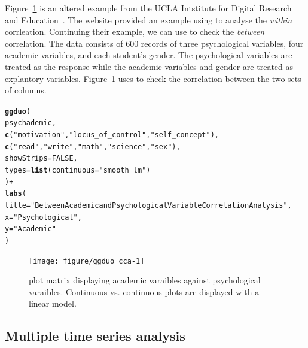 \documentclass[stat,dissertation]{puthesis}\usepackage[]{graphicx}\usepackage{xcolor}
\makeatletter
\newcommand{\hlnum}[1]{\textcolor[rgb]{0.686,0.059,0.569}{#1}}%
\newcommand{\hlstr}[1]{\textcolor[rgb]{0.192,0.494,0.8}{#1}}%
\newcommand{\hlopt}[1]{\textcolor[rgb]{0,0,0}{#1}}%
\newcommand{\hlstd}[1]{\textcolor[rgb]{0.345,0.345,0.345}{#1}}%
\newcommand{\hlkwc}[1]{\textcolor[rgb]{0.333,0.667,0.333}{#1}}%
\newcommand{\hlkwd}[1]{\textcolor[rgb]{0.737,0.353,0.396}{\textbf{#1}}}%
\newenvironment{kframe}{%
 \def\at@end@of@kframe{}%
 \ifinner\ifhmode%
  \def\at@end@of@kframe{\end{minipage}}%
  \begin{minipage}{\columnwidth}%
 \fi\fi%
 \def\FrameCommand##1{\hskip\@totalleftmargin \hskip-\fboxsep
 \colorbox{shadecolor}{##1}\hskip-\fboxsep
     \hskip-\linewidth \hskip-\@totalleftmargin \hskip\columnwidth}%
 \MakeFramed {\advance\hsize-\width
   \@totalleftmargin\z@ \linewidth\hsize
   \@setminipage}}%
 {\par\unskip\endMakeFramed%
 \at@end@of@kframe}
\newenvironment{knitrout}{}{} %
\renewenvironment{knitrout}{\setstretch{1}}{}
\makeatother
\begin{document}
Figure~\ref{fig:ggduo_cca} is an altered example from the UCLA Intstitute for Digital Research and Education~\cite{UclaCCA}.  The website provided an example using  to analyse the \emph{within} corrleation.  Continuing their example, we can use  to check the \emph{between} correlation.  The  data consists of 600 records of three psychological variables, four academic variables, and each student's gender.  The psychological variables are treated as the response while the academic variables and gender are treated as explantory variables.  Figure~\ref{fig:ggduo_cca} uses  to check the correlation between the two sets of columns.

\begin{knitrout}\small
{}\color{fgcolor}\begin{kframe}
\begin{alltt}
\hlkwd{ggduo}\hlstd{(}
  \hlstd{psychademic,}
  \hlkwd{c}\hlstd{(}\hlstr{"motivation"}\hlstd{,} \hlstr{"locus_of_control"}\hlstd{,} \hlstr{"self_concept"}\hlstd{),}
  \hlkwd{c}\hlstd{(}\hlstr{"read"}\hlstd{,} \hlstr{"write"}\hlstd{,} \hlstr{"math"}\hlstd{,} \hlstr{"science"}\hlstd{,} \hlstr{"sex"}\hlstd{),}
  \hlkwc{showStrips} \hlstd{=} \hlnum{FALSE}\hlstd{,}
  \hlkwc{types} \hlstd{=} \hlkwd{list}\hlstd{(}\hlkwc{continuous} \hlstd{=} \hlstr{"smooth_lm"}\hlstd{)}
\hlstd{)} \hlopt{+}
  \hlkwd{labs}\hlstd{(}
    \hlkwc{title} \hlstd{=} \hlstr{"Between Academic and Psychological Variable Correlation Analysis"}\hlstd{,}
    \hlkwc{x} \hlstd{=} \hlstr{"Psychological"}\hlstd{,}
    \hlkwc{y} \hlstd{=} \hlstr{"Academic"}
  \hlstd{)}
\end{alltt}
\end{kframe}\begin{figure}[H]

{\centering \texttt{[image: figure/ggduo\_cca-1]} 

}

\caption{ plot matrix displaying academic varaibles against psychological varaibles. Continuous vs. continuous plots are displayed with a linear model.}\label{fig:ggduo_cca}
\end{figure}


\end{knitrout}



  \subsection{Multiple time series analysis}
\end{document}
